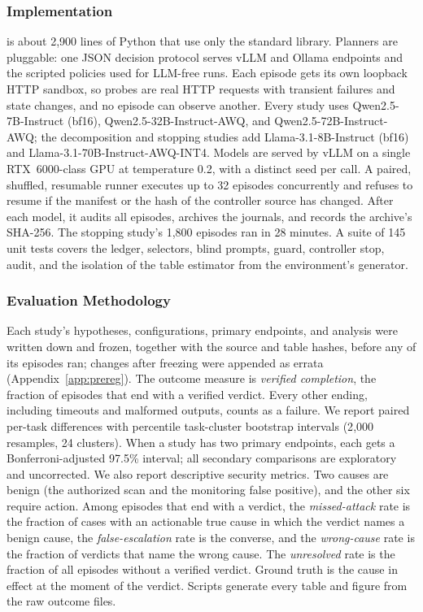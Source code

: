 \subsubsection{Implementation} \hesp{} is about 2{,}900 lines of Python that use only the standard library. Planners are pluggable: one JSON decision protocol serves vLLM and Ollama endpoints and the scripted policies used for LLM-free runs. Each episode gets its own loopback HTTP sandbox, so probes are real HTTP requests with transient failures and state changes, and no episode can observe another. Every study uses Qwen2.5-7B-Instruct (bf16), Qwen2.5-32B-Instruct-AWQ, and Qwen2.5-72B-Instruct-AWQ; the decomposition and stopping studies add Llama-3.1-8B-Instruct (bf16) and Llama-3.1-70B-Instruct-AWQ-INT4. Models are served by vLLM on a single RTX~6000-class GPU at temperature 0.2, with a distinct seed per call. A paired, shuffled, resumable runner executes up to 32 episodes concurrently and refuses to resume if the manifest or the hash of the controller source has changed. After each model, it audits all episodes, archives the journals, and records the archive's SHA-256. The stopping study's 1{,}800 episodes ran in 28 minutes. A suite of 145 unit tests covers the ledger, selectors, blind prompts, guard, controller stop, audit, and the isolation of the table estimator from the environment's generator.

\subsubsection{Evaluation Methodology} Each study's hypotheses, configurations, primary endpoints, and analysis were written down and frozen, together with the source and table hashes, before any of its episodes ran; changes after freezing were appended as errata (Appendix~\ref{app:prereg}). The outcome measure is \emph{verified completion}, the fraction of episodes that end with a verified verdict. Every other ending, including timeouts and malformed outputs, counts as a failure. We report paired per-task differences with percentile task-cluster bootstrap intervals (2{,}000 resamples, 24 clusters). When a study has two primary endpoints, each gets a Bonferroni-adjusted 97.5\% interval; all secondary comparisons are exploratory and uncorrected. We also report descriptive security metrics. Two causes are benign (the authorized scan and the monitoring false positive), and the other six require action. Among episodes that end with a verdict, the \emph{missed-attack} rate is the fraction of cases with an actionable true cause in which the verdict names a benign cause, the \emph{false-escalation} rate is the converse, and the \emph{wrong-cause} rate is the fraction of verdicts that name the wrong cause. The \emph{unresolved} rate is the fraction of all episodes without a verified verdict. Ground truth is the cause in effect at the moment of the verdict. Scripts generate every table and figure from the raw outcome files.
